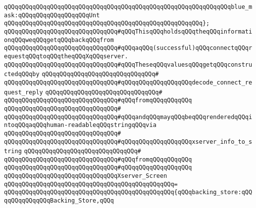 \verb|qQQqqQQqqQQqqQQqqQQqqQQqqQQqqQQqqQQqqQQqqQQqqQQqqQQqqQQqqQQqqQQqblue_mask:qQQqqQQqqQQqqQQqqQQqUnt|\newline
\verb|qQQqqQQqqQQqqQQqqQQqqQQqqQQqqQQqqQQqqQQqqQQqqQQqqQQqqQQq};|\newline
\newline
\newline
\verb|qQQqqQQqqQQqqQQqqQQqqQQqqQQqqQQq#qQQqThisqQQqholdsqQQqtheqQQqinformationqQQqweqQQqgetqQQqbackqQQqfrom|\newline
\verb|qQQqqQQqqQQqqQQqqQQqqQQqqQQqqQQq#qQQqaqQQq(successful)qQQqconnectqQQqrequestqQQqtoqQQqtheqQQqXqQQqserver.|\newline
\verb|qQQqqQQqqQQqqQQqqQQqqQQqqQQqqQQq#qQQqTheseqQQqvaluesqQQqgetqQQqconstructedqQQqby|\newline
\verb|qQQqqQQqqQQqqQQqqQQqqQQqqQQqqQQq#|\newline
\verb|qQQqqQQqqQQqqQQqqQQqqQQqqQQqqQQq#qQQqqQQqqQQqqQQqqQQqdecode_connect_request_reply|\newline
\verb|qQQqqQQqqQQqqQQqqQQqqQQqqQQqqQQq#|\newline
\verb|qQQqqQQqqQQqqQQqqQQqqQQqqQQqqQQq#qQQqfromqQQqqQQqqQQq|\newline
\verb|qQQqqQQqqQQqqQQqqQQqqQQqqQQqqQQq#|\newline
\verb|qQQqqQQqqQQqqQQqqQQqqQQqqQQqqQQq#qQQqandqQQqmayqQQqbeqQQqrenderedqQQqintoqQQqaqQQqhuman-readableqQQqstringqQQqvia|\newline
\verb|qQQqqQQqqQQqqQQqqQQqqQQqqQQqqQQq#|\newline
\verb|qQQqqQQqqQQqqQQqqQQqqQQqqQQqqQQq#qQQqqQQqqQQqqQQqqQQqxserver_info_to_string|\newline
\verb|qQQqqQQqqQQqqQQqqQQqqQQqqQQqqQQq#|\newline
\verb|qQQqqQQqqQQqqQQqqQQqqQQqqQQqqQQq#qQQqfromqQQqqQQqqQQq|\newline
\verb|qQQqqQQqqQQqqQQqqQQqqQQqqQQqqQQq#qQQqqQQqqQQqqQQqqQQq|\newline
\verb|qQQqqQQqqQQqqQQqqQQqqQQqqQQqqQQqXserver_Screen|\newline
\verb|qQQqqQQqqQQqqQQqqQQqqQQqqQQqqQQqqQQqqQQqqQQqqQQq=|\newline
\verb|qQQqqQQqqQQqqQQqqQQqqQQqqQQqqQQqqQQqqQQqqQQqqQQq{qQQqbacking_store:qQQqqQQqqQQqqQQqBacking_Store,qQQq|\newline
